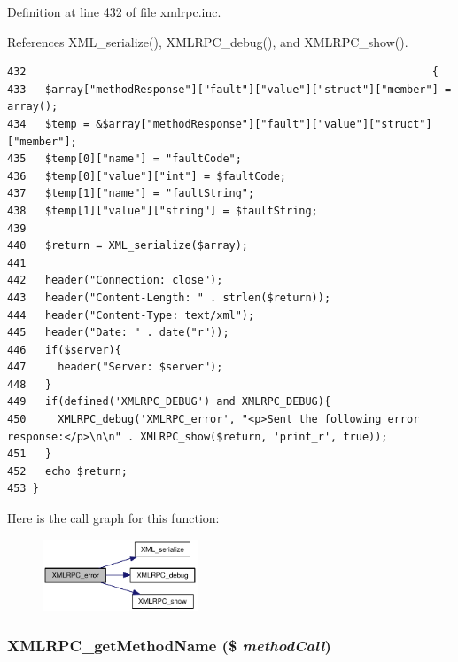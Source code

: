 Definition at line 432 of file xmlrpc.inc.

References XML\_\-serialize(), XMLRPC\_\-debug(), and XMLRPC\_\-show().

\begin{Code}\begin{verbatim}432                                                                {
433   $array["methodResponse"]["fault"]["value"]["struct"]["member"] = array();
434   $temp = &$array["methodResponse"]["fault"]["value"]["struct"]["member"];
435   $temp[0]["name"] = "faultCode";
436   $temp[0]["value"]["int"] = $faultCode;
437   $temp[1]["name"] = "faultString";
438   $temp[1]["value"]["string"] = $faultString;
439 
440   $return = XML_serialize($array);
441 
442   header("Connection: close");
443   header("Content-Length: " . strlen($return));
444   header("Content-Type: text/xml");
445   header("Date: " . date("r"));
446   if($server){
447     header("Server: $server");
448   }
449   if(defined('XMLRPC_DEBUG') and XMLRPC_DEBUG){
450     XMLRPC_debug('XMLRPC_error', "<p>Sent the following error response:</p>\n\n" . XMLRPC_show($return, 'print_r', true));
451   }
452   echo $return;
453 }
\end{verbatim}
\end{Code}




Here is the call graph for this function:\nopagebreak
\begin{figure}[H]
\begin{center}
\leavevmode
\includegraphics[width=131pt]{xmlrpc_8inc_0cdc54b1376ccbbe412175c9819a95ac_cgraph}
\end{center}
\end{figure}
\hypertarget{xmlrpc_8inc_70efa062e92a380196ed8053850c0906}{
\subsubsection{\setlength{\rightskip}{0pt plus 5cm}XMLRPC\_\-getMethodName (\$ {\em methodCall})}}
\label{xmlrpc_8inc_70efa062e92a380196ed8053850c0906}




